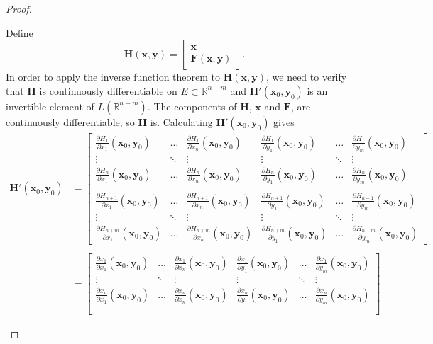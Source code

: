 \documentclass{article}
\newcommand{\R}{\mathbb{R}}
\newcommand{\x}{\mathbf{x}}
\newcommand{\F}{\mathbf{F}}
\newcommand{\y}{\mathbf{y}}
\theoremstyle{definition}
\begin{document}
\begin{proof}
\begin{enumerate}
	Define 
	$$ \mathbf H(\x,\y) = \begin{bmatrix}
		\x \\ \F(\x,\y)
	\end{bmatrix}.$$ In order to apply the inverse function theorem to $ \mathbf H(\x,\y) $, we need to verify that $ \mathbf H $ is continuously differentiable on $ E\subset \R^{n+m} $ and $ \mathbf H'(\x_0,\y_0) $ is an invertible element of $ L(\R^{n+m}) $.  The components of $ \mathbf H $, $ \x $ and $ \F $, are continuously differentiable, so $ \mathbf H $ is. Calculating $ \mathbf H'(\x_0,\y_0) $ gives 
	\begin{align*}
		 \mathbf H'(\x_0,\y_0)  & = \begin{bmatrix}
		 	\frac{\partial H_1}{\partial x_1}(\x_0,\y_0)  & \ldots & \frac{\partial H_1}{\partial x_n}(\x_0,\y_0)  &  \frac{\partial H_1}{\partial y_1}(\x_0,\y_0)  & \ldots & \frac{\partial H_1}{\partial y_m}(\x_0,\y_0) \\ \vdots &\ddots & \vdots &\vdots & \ddots & \vdots \\ 
		 	 	\frac{\partial H_n}{\partial x_1}(\x_0,\y_0)  & \ldots & \frac{\partial H_n}{\partial x_n}(\x_0,\y_0)  &  \frac{\partial H_n}{\partial y_1}(\x_0,\y_0)  & \ldots & \frac{\partial H_n}{\partial y_m}(\x_0,\y_0) \\\\
		 	 	\frac{\partial H_{n+1}}{\partial x_1}(\x_0,\y_0)  & \ldots & \frac{\partial H_{n+1}}{\partial x_n}(\x_0,\y_0)  &  \frac{\partial H_{n+1}}{\partial y_1}(\x_0,\y_0)  & \ldots & \frac{\partial H_{n+1}}{\partial y_m}(\x_0,\y_0) \\
		 	 	\vdots &\ddots & \vdots &\vdots & \ddots & \vdots \\ 
		 	 		\frac{\partial H_{n+m}}{\partial x_1}(\x_0,\y_0)  & \ldots & \frac{\partial H_{n+m}}{\partial x_n}(\x_0,\y_0)  &  \frac{\partial H_{n+m}}{\partial y_1}(\x_0,\y_0)  & \ldots & \frac{\partial H_{n+m}}{\partial y_m}(\x_0,\y_0) 
		 \end{bmatrix}\\ \\ 	 
	  & = \begin{bmatrix}
		 \frac{\partial x_1}{\partial x_1}(\x_0,\y_0)  & \ldots & \frac{\partial x_1}{\partial x_n}(\x_0,\y_0)  &  \frac{\partial x_1}{\partial y_1}(\x_0,\y_0)  & \ldots & \frac{\partial x_1}{\partial y_m}(\x_0,\y_0) \\ \vdots &\ddots & \vdots &\vdots & \ddots & \vdots \\ 
		 \frac{\partial x_n}{\partial x_1}(\x_0,\y_0)  & \ldots & \frac{\partial x_n}{\partial x_n}(\x_0,\y_0)  &  \frac{\partial x_n}{\partial y_1}(\x_0,\y_0)  & \ldots & \frac{\partial x_n}{\partial y_m}(\x_0,\y_0) \\\\

\end{bmatrix}
\end{align*}
\end{enumerate}
\end{proof}
\end{document}
